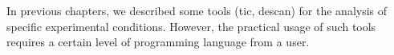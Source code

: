 %
%
%
%
%

In previous chapters, we described some tools (\gls{tic}, \gls{descan}) for the analysis of specific experimental conditions.
However, the practical usage of such tools requires a certain level of programming language from a user.


